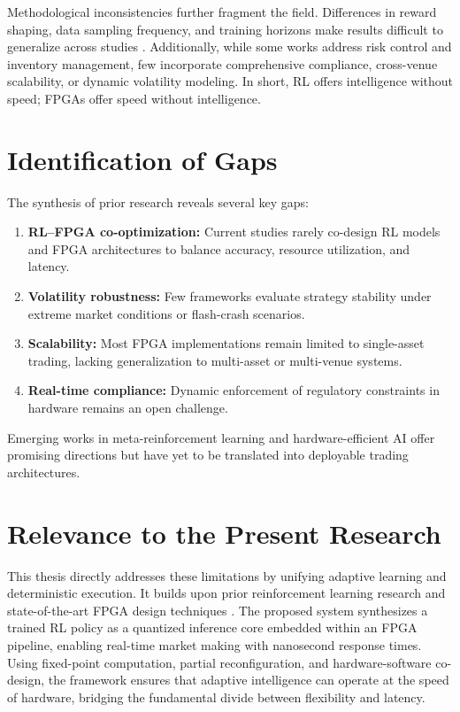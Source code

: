 Methodological inconsistencies further fragment the field. Differences in reward shaping, data sampling frequency, and training horizons make results difficult to generalize across studies \citep{Ragel2025,Su2025,Jiang2025}. Additionally, while some works address risk control and inventory management, few incorporate comprehensive compliance, cross-venue scalability, or dynamic volatility modeling. In short, RL offers intelligence without speed; FPGAs offer speed without intelligence.

\section{Identification of Gaps}
\label{sec:research_gaps}
The synthesis of prior research reveals several key gaps:
\begin{enumerate}
    \item \textbf{RL–FPGA co-optimization:} Current studies rarely co-design RL models and FPGA architectures to balance accuracy, resource utilization, and latency.
    \item \textbf{Volatility robustness:} Few frameworks evaluate strategy stability under extreme market conditions or flash-crash scenarios.
    \item \textbf{Scalability:} Most FPGA implementations remain limited to single-asset trading, lacking generalization to multi-asset or multi-venue systems.
    \item \textbf{Real-time compliance:} Dynamic enforcement of regulatory constraints in hardware remains an open challenge.
\end{enumerate}
Emerging works in meta-reinforcement learning \citep{Briere2025} and hardware-efficient AI \citep{Zhang2024,Schneider2023} offer promising directions but have yet to be translated into deployable trading architectures.

\section{Relevance to the Present Research}
\label{sec:relevance}
This thesis directly addresses these limitations by unifying adaptive learning and deterministic execution. It builds upon prior reinforcement learning research \citep{Spooner2020,Patel2022,Kumar2023,Vakkilainen2023,Ragel2025,Su2025,Jiang2025,Li2025} and state-of-the-art FPGA design techniques \citep{Lockwood2012,Gupta2024,Joshua2025,AlAhmed2024,Shams2024}. The proposed system synthesizes a trained RL policy as a quantized inference core embedded within an FPGA pipeline, enabling real-time market making with nanosecond response times. Using fixed-point computation, partial reconfiguration, and hardware-software co-design, the framework ensures that adaptive intelligence can operate at the speed of hardware, bridging the fundamental divide between flexibility and latency.

